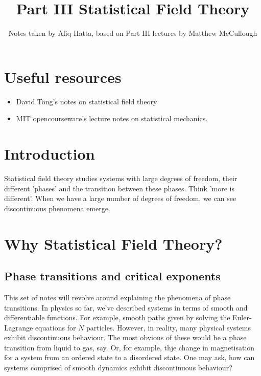 \documentclass[11pt, oneside]{article}   	%
\title{Part III Statistical Field Theory}
\author{Notes taken by Afiq Hatta, based on Part III lectures by Matthew McCullough}
\begin{document}
\maketitle
\tableofcontents

\pagebreak 

\section{Useful resources}
\begin{itemize}
	\item David Tong's notes on statistical field theory 
	\item MIT opencourseware's lecture notes on statistical mechanics. 
\end{itemize}

\section{Introduction}

Statistical field theory studies systems with large degrees of freedom, their different 'phases'  and the transition between these phases. Think 'more is different'. When we have a large number of degrees of freedom, we can see discontinuous phenomena emerge. 

\section{Why Statistical Field Theory?} 
\subsection{Phase transitions and critical exponents} 
This set of notes will revolve around explaining the phenomena of phase transitions. In physics so far, we've described systems in terms of smooth and differentiable functions. For example, smooth paths given by solving the Euler-Lagrange equations for $N$ particles. However, in reality, many physical systems exhibit discontinuous behaviour. The most obvious of these would be a phase transition from liquid to gas, say. Or, for example, thje change in magnetisation for a system from an ordered state to a disordered state. One may ask, how can systems comprised of smooth dynamics exhibit discontinuous behaviour? 
\end{document}
